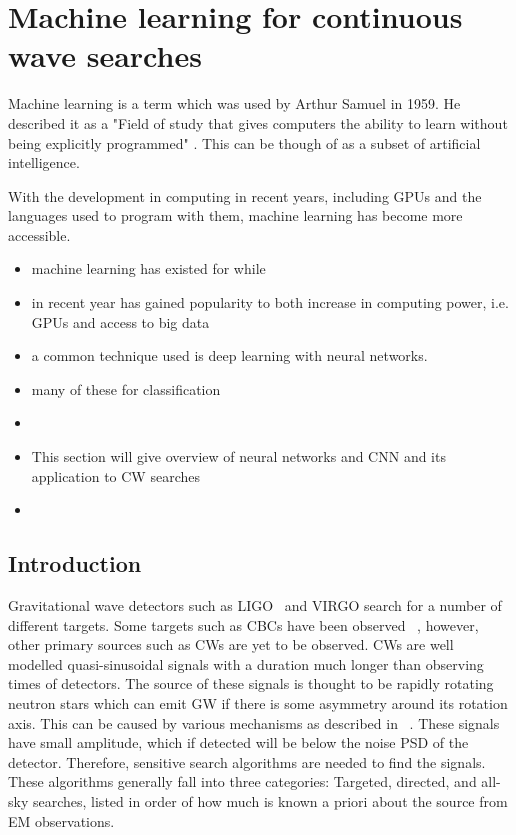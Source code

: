 \chapter{\label{cnn} Machine learning for continuous wave searches}


Machine learning is a term which was used by Arthur Samuel in 1959. 
He described it as a "Field of study that gives computers the ability to learn without being explicitly programmed" \citep{}.
This can be though of as a subset of artificial intelligence. 

With the development in computing in recent years, including GPUs and the languages used to program with them, machine learning has become more accessible. 


\begin{itemize}
	\item machine learning has existed for while
	\item in recent year has gained popularity to both increase in computing power, i.e. GPUs and access to big data
	\item a common technique used is deep learning with neural networks. 
	\item many of these for classification
	\item 
	\item This section will give overview of neural networks and CNN and its application to CW searches
	\item 
\end{itemize}



\section{\label{machine:intro} Introduction}

%
Gravitational wave detectors such as \ac{LIGO}~\cite{abbott2009LIGOLaser,aasi2015AdvancedLIGO} and VIRGO
\cite{acernese2015AdvancedVirgo,acernese2008StatusVirgo} search for a number of different targets. 
Some targets such as \acp{CBC} have been observed ~\cite{abbott2017GW170817Observation,abbott2017GW170814ThreeDetector,abbott2016ObservationGravitational},
however, other primary sources such as \acp{CW} are yet to be observed.
\acp{CW} are well modelled quasi-sinusoidal signals with a
duration much longer than observing times of detectors.
The source of these signals is thought to be rapidly rotating neutron stars which can emit \ac{GW} if there is some asymmetry around its rotation axis. 
This can be caused by various mechanisms as described in ~\cite{prix2009GravitationalWaves}. 
These signals have small amplitude, which if detected will be below the noise \ac{PSD} of the detector.
Therefore, sensitive search algorithms are needed to find the signals. 
These algorithms generally fall into three categories: Targeted,
directed, and all-sky searches, listed in order of how much is known a priori
about the source from \ac{EM} observations. 

